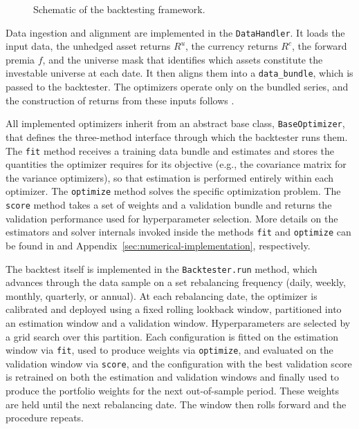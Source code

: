 \begin{figure}[ht]
\begin{center}
\end{center}
\caption{Schematic of the backtesting framework.}
\label{fig:backtest}
\end{figure} 
 
Data ingestion and alignment are implemented in the \texttt{DataHandler}.
It loads the input data, the unhedged asset returns $R^u$, the currency returns
$R^c$, the forward premia $f$, and the universe mask that identifies which
assets constitute the investable universe at each date. It then aligns them into a
\texttt{data\_bundle}, which is passed to the backtester. The optimizers operate only on the
bundled series, and the construction of returns from
these inputs follows .

All implemented optimizers inherit from an abstract base class, \texttt{BaseOptimizer}, that
defines the three-method interface through which the backtester runs them. The
\texttt{fit} method receives a training data bundle and estimates and stores the
quantities the optimizer requires for its objective (e.g., the covariance matrix for the variance optimizers), so that estimation is
performed entirely within each optimizer.
The \texttt{optimize} method solves the specific optimization problem. The \texttt{score} method takes a set of weights and a
validation bundle and returns the validation performance used for hyperparameter
selection. 
More details on the estimators and solver internals invoked inside the methods \texttt{fit} and
\texttt{optimize} can be found in  and Appendix~\ref{sec:numerical-implementation}, respectively.

The backtest itself is implemented in the \texttt{Backtester.run} method, which
advances through the data sample on a set rebalancing frequency (daily, weekly, monthly, quarterly, or annual). At each
rebalancing date, the optimizer is calibrated and deployed using a fixed rolling lookback window, partitioned into  an estimation window and a validation window. Hyperparameters are selected by a grid search over
this partition. Each configuration is fitted on the estimation window
via \texttt{fit}, used to produce weights via \texttt{optimize}, and evaluated on
the validation window via \texttt{score}, and the configuration with the
best validation score is retrained on both the estimation and validation windows and finally used to 
produce the portfolio weights for the next out-of-sample period. 
These weights are held until the next rebalancing date. The window then rolls forward and the procedure
repeats.

